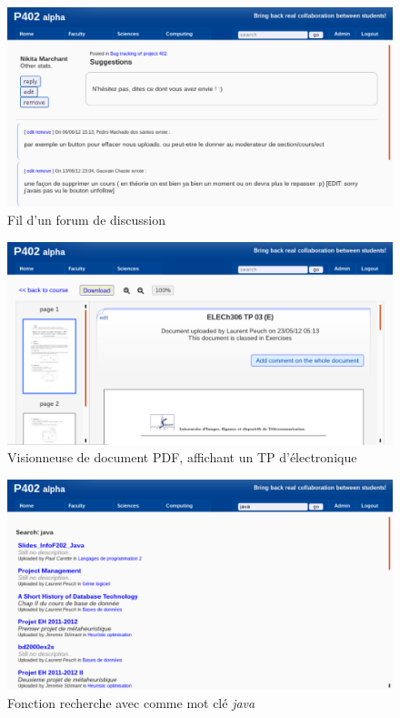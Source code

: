 \documentclass[a4paper,12pt]{article}
\begin{document}
\begin{figure}
  \centering\includegraphics[scale=0.5]{imgs/forum.pdf}
  \caption{Fil d'un forum de discussion}
  \label{fig:forum}
\end{figure}

\begin{figure}
  \centering\includegraphics[scale=0.5]{imgs/viewer.pdf}
  \caption{Visionneuse de document PDF, affichant un TP d'électronique}
  \label{fig:viewer}
\end{figure}

\begin{figure}
  \centering\includegraphics[scale=0.5]{imgs/search.pdf}
  \caption{Fonction recherche avec comme mot clé \textit{java}}
  \label{fig:search}
\end{figure}
\end{document}
